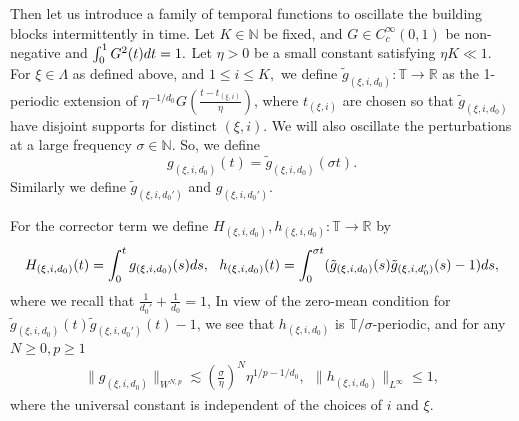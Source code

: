 \documentclass[10pt,a4paper]{amsart}
\numberwithin{equation}{section}
\def\dif{{\mathord{{\rm d}}}}
\def\mN{{\mathbb N}}
\def\geq{\geqslant}
\def\leq{\leqslant}
\def\le{\leqslant}
\def\dif{{\mathord{{\rm d}}}}
\def\geq{\geqslant}
\def\leq{\leqslant}
\def\le{\leqslant}
\begin{document}
Then let us  introduce a family of temporal functions   to oscillate the building blocks intermittently in time.
Let  $K\in\mN$ be fixed, and $G \in C_c^\infty(0, 1)$ be non-negative and 
$ \int_0^1G^2(t)\dif t=1.$
  Let $\eta >0$  be a small constant satisfying $ \eta K\ll1$. For $\xi\in\Lambda$ as defined above,  and $1\le i\le K,$ we define $\tilde{g}_{(\xi,i,d_0)}: \mathbb{T}\to \mathbb{R}$ as the 1-periodic extension of $\eta^{-1/d_0}G(\frac {t-t_{(\xi,i)}}{\eta})$,  where $t_{(\xi,i)}$ are chosen so that $\tilde{g}_{(\xi,i,d_0)}$ have disjoint supports for distinct $(\xi,i)$.  
We will also oscillate the perturbations at a large
frequency $\sigma\in\mathbb{N}$. So, we define
$$g_{(\xi,i,d_0)}(t)=\tilde{g}_{(\xi,i,d_0)}(\sigma t).$$
Similarly we define $\tilde{g}_{(\xi,i,d_0')} $ and $g_{(\xi,i,d_0')} $.

For the corrector term we define $H_{(\xi,i,d_0)},h_{(\xi,i,d_0)}:\mathbb{T}\to\mathbb{R}$ by
\begin{align}
H_{(\xi,i,d_0)}(t)=\int_0^{t}g_{(\xi,i,d_0)}(s)\dif s,\ \ h_{(\xi,i,d_0)}(t)=\int_0^{\sigma t}(\tilde{g}_{(\xi,i,d_0)}(s)\tilde{g}_{(\xi,i,d_0')}(s)-1)\dif s, \label{eq:parth}
\end{align}
where we recall that $\frac1{d_0'}+\frac1{d_0}=1$, In view of the zero-mean condition for $\tilde{g}_{(\xi,i,d_0)}(t)\tilde{g}_{(\xi,i,d_0')}(t)-1$, we see that $h_{(\xi,i,d_0)}$ is $\mathbb{T}/\sigma$-periodic, and for any $N\geq0,p\geq1$
\begin{align}
    \|g_{(\xi,i,d_0)}\|_{W^{N,p}}\lesssim(\frac{\sigma}{\eta})^N\eta^{1/p-1/d_0},\  \  \|h_{(\xi,i,d_0)}\|_{L^\infty}\leq1,\label{bd:gwnp}
\end{align}
where the universal constant is independent of the choices of  $i$ and $\xi$.
\end{document}
